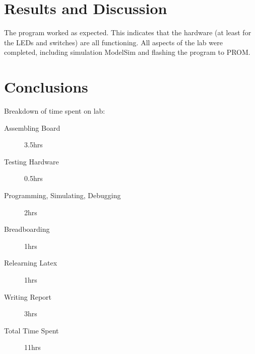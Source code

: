 \documentclass[11pt]{article}
\begin{document}
\clearpage

\section{Results and Discussion}

The program worked as expected. This indicates that the hardware (at least for the LEDs and switches) are all functioning. All aspects of the lab were completed, including simulation ModelSim and flashing the program to PROM. 



\section{Conclusions}

Breakdown of time spent on lab:
\begin{description}
	\item[Assembling Board] 3.5hrs
	\item[Testing Hardware] 0.5hrs
	\item[Programming, Simulating, Debugging] 2hrs
	\item[Breadboarding] 1hrs
	\item[Relearning Latex] 1hrs
	\item[Writing Report] 3hrs
	\item[Total Time Spent] 11hrs
\end{description}
\end{document}
